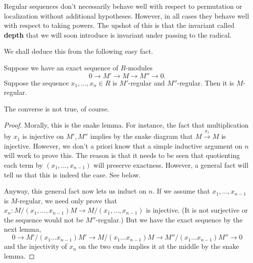 Regular sequences don't necessarily behave well with respect to permutation or
localization without additional hypotheses. However, in all cases they behave
well with respect to taking powers. The upshot of this is that the invariant
called \textbf{depth} that we will soon introduce is invariant under passing to
the radical.

We shall deduce this from the following easy fact.
\begin{lemma} 
Suppose we have an exact sequence of $R$-modules
\[  0 \to M' \to M \to M'' \to 0.  \]
Suppose the sequence $x_1, \dots, x_n \in R$ is $M'$-regular and $M''$-regular.
Then it is $M$-regular.
\end{lemma} 
The converse is not true, of course.
\begin{proof} 
Morally, this is the snake lemma. For instance, the fact that multiplication by
$x_1$ is injective on $M', M''$ implies by the snake diagram that $M
\stackrel{x_1}{\to} M$ is injective. However, we don't a priori know that a
simple inductive argument on $n$ will work to prove this. The reason is that it needs
to be seen that quotienting each term by $(x_1, \dots, x_{n-1})$ will preserve
exactness. However, a general fact will tell us that this is indeed the case.
See below.

Anyway, this general fact now lets us induct on $n$. If we assume
that $x_1, \dots, x_{n-1}$ is $M$-regular, we need only prove that $x_{n}:
M/(x_1, \dots, x_{n-1})M
\to M/(x_1, \dots, x_{n-1})$ is injective. (It is not surjective or the
sequence would not be $M''$-regular.) But we have the exact sequence by the
next lemma,
\[ 0 \to M'/(x_1 \dots x_{n-1})M' \to M/(x_1 \dots x_{n-1})M \to  M''/(x_1
\dots x_{n-1})M'' \to 0 \]
and the injectivity of $x_n$ on the two ends implies it at the middle by the
snake lemma.
\end{proof} 

